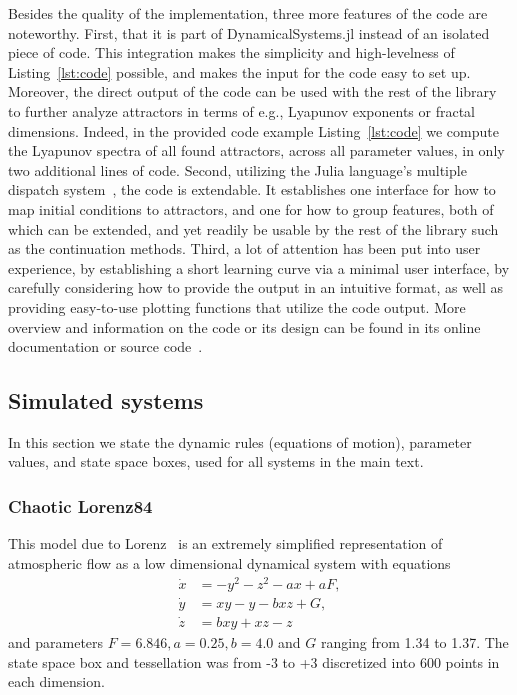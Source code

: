 \documentclass[%
 aip,
 amsmath,amssymb,
 reprint,%
]{revtex4-1}
\begin{document}
Besides the quality of the implementation, three more features of the code are noteworthy. First, that it is part of DynamicalSystems.jl instead of an isolated piece of code. This integration makes the simplicity and high-levelness of Listing~\ref{lst:code} possible, and makes the input for the code easy to set up. Moreover, the direct output of the code can be used with the rest of the library to further analyze attractors in terms of e.g., Lyapunov exponents or fractal dimensions. Indeed, in the provided code example Listing~\ref{lst:code} we compute the Lyapunov spectra of all found attractors, across all parameter values, in only two additional lines of code. Second, utilizing the Julia language's multiple dispatch system~\cite{bezanson2017julia}, the code is extendable. It establishes one interface for how to map initial conditions to attractors, and one for how to group features, both of which can be extended, and yet readily be usable by the rest of the library such as the continuation methods. Third, a lot of attention has been put into user experience, by establishing a short learning curve via a minimal user interface, by carefully considering how to provide the output in an intuitive format, as well as providing easy-to-use plotting functions that utilize the code output. More overview and information on the code or its design can be found in its online documentation or source code~\cite{Attractors.jl}.

\subsection{Simulated systems}\label{sec:systems}
In this section we state the dynamic rules (equations of motion), parameter values, and state space boxes, used for all systems in the main text.

\subsubsection*{Chaotic Lorenz84} This model due to Lorenz~\cite{Lorenz84} is an extremely simplified representation of atmospheric flow as a low dimensional dynamical system with equations
\begin{align*}
\dot x &= - y^2 - z^2 - ax + aF, \\
\dot y &= xy - y - bxz + G, \\
\dot z &= bxy + xz - z
\end{align*}
and parameters $F=6.846, a=0.25, b=4.0$ and $G$ ranging from 1.34 to 1.37. The state space box and tessellation was from -3 to +3 discretized into 600 points in each dimension.
\end{document}
